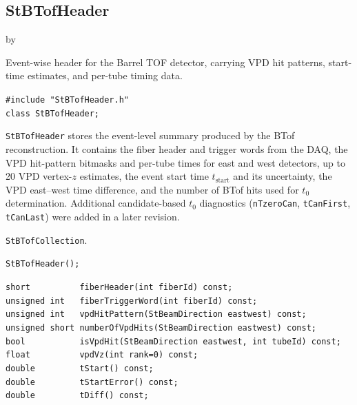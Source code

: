 \documentclass[twoside]{article}
\newcommand{\entrylabel}[1]{\mbox{\textbf{{#1}}}\hfil}%
\newenvironment{entry}
{\begin{list}{}%
    {\renewcommand{\makelabel}{\entrylabel}%
     \setlength{\labelwidth}{90pt}%
     \setlength{\leftmargin}{\labelwidth}
     \advance\leftmargin by \labelsep%
      }%
    }%
  {\end{list}}
\newcommand{\Entrylabel}[1]%
{\raisebox{0pt}[1ex][0pt]{\makebox[\labelwidth][l]%
    {\parbox[t]{\labelwidth}{\hspace{0pt}\textbf{{#1}}}}}}
\newenvironment{Entry}%
{\renewcommand{\entrylabel}{\Entrylabel}\begin{entry}}%
  {\end{entry}}
\begin{document}
\subsection{StBTofHeader}
\label{sec:StBTofHeader}
\begin{Entry}
\item[Summary] Event-wise header for the Barrel TOF detector, carrying VPD
    hit patterns, start-time estimates, and per-tube timing data.
\item[Synopsis]
    \verb+#include "StBTofHeader.h"+\\
    \verb+class StBTofHeader;+\\
\item[Description]
    \texttt{StBTofHeader} stores the event-level summary produced by the BTof
    reconstruction.  It contains the fiber header and trigger words from the DAQ,
    the VPD hit-pattern bitmasks and per-tube times for east and west detectors,
    up to 20 VPD vertex-$z$ estimates, the event start time $t_\text{start}$ and
    its uncertainty, the VPD east--west time difference, and the number of BTof
    hits used for $t_0$ determination.  Additional candidate-based $t_0$
    diagnostics (\verb+nTzeroCan+, \verb+tCanFirst+, \verb+tCanLast+) were
    added in a later revision.
\item[Related Classes]
    \texttt{StBTofCollection}.
\item[Public\\ Constructors]
    \verb+StBTofHeader();+\\
\item[Public Member\\ Functions]
    \verb+short          fiberHeader(int fiberId) const;+\\
    \verb+unsigned int   fiberTriggerWord(int fiberId) const;+\\
    \verb+unsigned int   vpdHitPattern(StBeamDirection eastwest) const;+\\
    \verb+unsigned short numberOfVpdHits(StBeamDirection eastwest) const;+\\
    \verb+bool           isVpdHit(StBeamDirection eastwest, int tubeId) const;+\\
    \verb+float          vpdVz(int rank=0) const;+\\
    \verb+double         tStart() const;+\\
    \verb+double         tStartError() const;+\\
    \verb+double         tDiff() const;+\\

\end{Entry}
\end{document}
